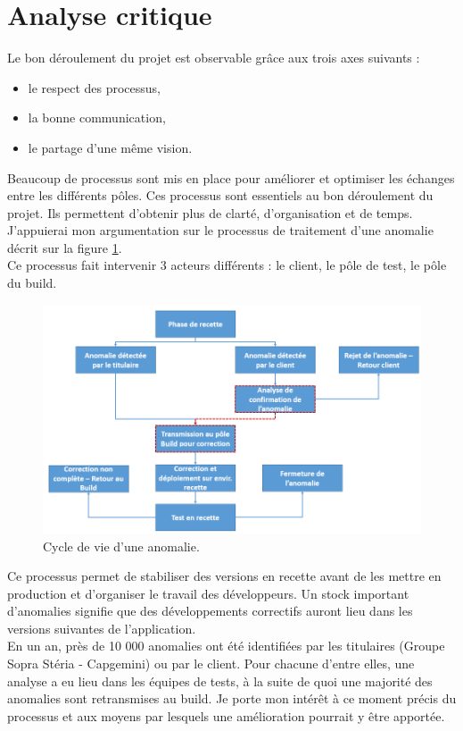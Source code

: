 \documentclass[12pt,a4paper]{article}
\begin{document}
\section{Analyse critique}
Le bon déroulement du projet est observable grâce aux trois axes suivants :
\smallbreak
\begin{itemize}
\item le respect des processus,
\item la bonne communication,
\item le partage d'une même vision.
\end{itemize}
\medbreak
Beaucoup de processus sont mis en place pour améliorer et optimiser les échanges entre les différents pôles. Ces processus sont essentiels au bon déroulement du projet. Ils permettent d'obtenir plus de clarté, d'organisation et de temps. J'appuierai mon argumentation sur le processus de traitement d'une anomalie décrit sur la figure \ref{cycleVieAnomalie}.\\
Ce processus fait intervenir 3 acteurs différents : le client, le pôle de test, le pôle du build. 
\begin{figure}[!hp]
		\begin{center}
			\includegraphics[width=1.1\textwidth,keepaspectratio]{cycleAnomalie2.png}
			\caption{Cycle de vie d'une anomalie.}
			\label{cycleVieAnomalie}
		\end{center}
\end{figure}
\clearpage
\newpage
Ce processus permet de stabiliser des versions en recette avant de les mettre en production et d'organiser le travail des développeurs. Un stock important d'anomalies signifie que des développements correctifs auront lieu dans les versions suivantes de l'application.\\
En un an, près de 10 000 anomalies ont été identifiées par les titulaires (Groupe Sopra Stéria - Capgemini) ou par le client. Pour chacune d'entre elles, une analyse a eu lieu dans les équipes de tests, à la suite de quoi une majorité des anomalies sont retransmises au build. Je porte mon intérêt à ce moment précis du processus et aux moyens par lesquels une amélioration pourrait y être apportée.\\
\end{document}
